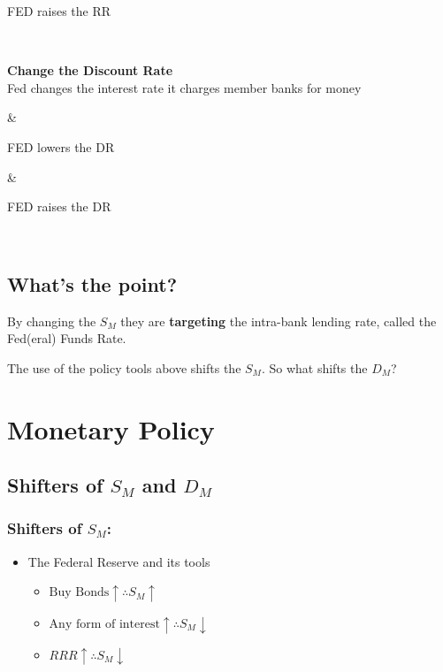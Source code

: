 \documentclass[
  letterpaper,
  DIV=11,
  numbers=noendperiod]{scrartcl}
\providecommand{\tightlist}{%
  \setlength{\itemsep}{0pt}\setlength{\parskip}{0pt}}\usepackage{longtable,booktabs,array}
\begin{document}
\begin{longtable}[]
\begin{minipage}[t]{\linewidth}
FED raises the RR\\
\strut
\end{minipage} \\
\begin{minipage}[t]{\linewidth}\raggedright
\textbf{Change the Discount Rate}\\
Fed changes the interest rate it charges member banks for money\strut
\end{minipage} & \begin{minipage}[t]{\linewidth}\raggedright
FED lowers the DR\\
\strut
\end{minipage} & \begin{minipage}[t]{\linewidth}\raggedright
FED raises the DR\\
\strut
\end{minipage} \\
\end{longtable}

\subsection{What's the point?}\label{whats-the-point}

By changing the \(S_M\) they are \textbf{targeting} the intra-bank
lending rate, called the Fed(eral) Funds Rate.

The use of the policy tools above shifts the \(S_M\). So what shifts the
\(D_M\)?

\section{Monetary Policy}\label{monetary-policy}

\subsection{\texorpdfstring{Shifters of \(S_M\) and
\(D_M\)}{Shifters of S\_M and D\_M}}\label{shifters-of-s_m-and-d_m}

\subsubsection{\texorpdfstring{Shifters of
\(S_M\):}{Shifters of S\_M:}}\label{shifters-of-s_m}

\begin{itemize}
\tightlist
\item
  The Federal Reserve and its tools

  \begin{itemize}
  \tightlist
  \item
    \(\text{Buy Bonds} \uparrow \therefore S_M \uparrow\)
  \item
    \(\text{Any form of interest} \uparrow \therefore S_M \downarrow\)
  \item
    \(RRR \uparrow \therefore S_M \downarrow\)
  \end{itemize}
\end{itemize}
\end{document}
